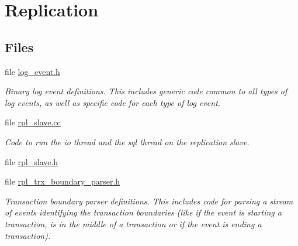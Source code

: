 \hypertarget{group__Replication}{}\section{Replication}
\label{group__Replication}
\subsection*{Files}
\begin{DoxyCompactItemize}
\item 
file \mbox{\hyperlink{log__event_8h}{log\+\_\+event.\+h}}
\begin{DoxyCompactList}\small\item\em Binary log event definitions. This includes generic code common to all types of log events, as well as specific code for each type of log event. \end{DoxyCompactList}\item 
file \mbox{\hyperlink{rpl__slave_8cc}{rpl\+\_\+slave.\+cc}}
\begin{DoxyCompactList}\small\item\em Code to run the io thread and the sql thread on the replication slave. \end{DoxyCompactList}\item 
file \mbox{\hyperlink{rpl__slave_8h}{rpl\+\_\+slave.\+h}}
\item 
file \mbox{\hyperlink{rpl__trx__boundary__parser_8h}{rpl\+\_\+trx\+\_\+boundary\+\_\+parser.\+h}}
\begin{DoxyCompactList}\small\item\em Transaction boundary parser definitions. This includes code for parsing a stream of events identifying the transaction boundaries (like if the event is starting a transaction, is in the middle of a transaction or if the event is ending a transaction). \end{DoxyCompactList}\end{DoxyCompactItemize}
